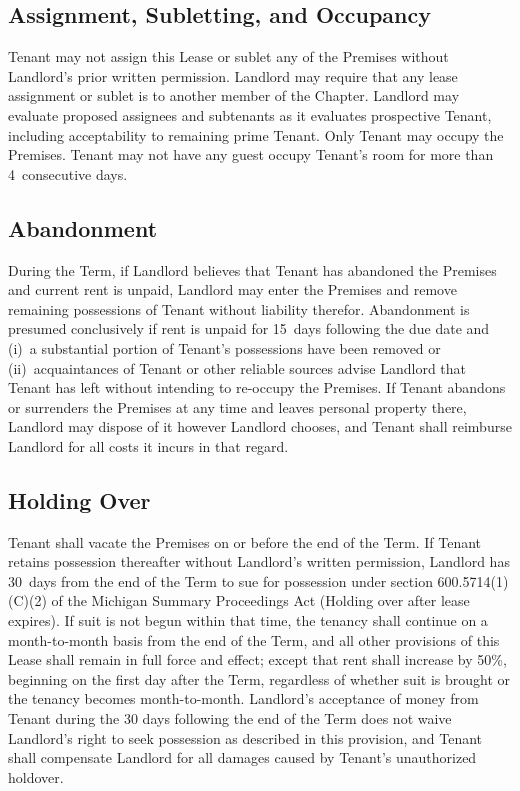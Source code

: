 \documentclass{article}
\begin{document}
\subsection{Assignment, Subletting, and Occupancy}
Tenant may not assign this Lease or sublet any of the Premises without
Landlord’s prior written permission. Landlord may require that any lease
assignment or sublet is to another member of the Chapter. Landlord may evaluate
proposed assignees and subtenants as it evaluates prospective Tenant, including
acceptability to remaining prime Tenant. Only Tenant may occupy the Premises.
Tenant may not have any guest occupy Tenant’s room for more than 4~consecutive
days.

\subsection{Abandonment}
During the Term, if Landlord believes that Tenant has abandoned the Premises and
current rent is unpaid, Landlord may enter the Premises and remove remaining
possessions of Tenant without liability therefor. Abandonment is presumed
conclusively if rent is unpaid for 15~days following the due date and (i)~a
substantial portion of Tenant’s possessions have been removed or
(ii)~acquaintances of Tenant or other reliable sources advise Landlord that
Tenant has left without intending to re-occupy the Premises. If Tenant abandons
or surrenders the Premises at any time and leaves personal property there,
Landlord may dispose of it however Landlord chooses, and Tenant shall reimburse
Landlord for all costs it incurs in that regard.

\subsection{Holding Over}
Tenant shall vacate the Premises on or before the end of the Term. If Tenant
retains possession thereafter without Landlord’s written permission, Landlord
has 30~days from the end of the Term to sue for possession under section
600.5714(1)(C)(2) of the Michigan Summary Proceedings Act (Holding over after
lease expires). If suit is not begun within that time, the tenancy shall
continue on a month-to-month basis from the end of the Term, and all other
provisions of this Lease shall remain in full force and effect; except that rent
shall increase by 50\%, beginning on the first day after the Term, regardless of
whether suit is brought or the tenancy becomes month-to-month. Landlord’s
acceptance of money from Tenant during the 30 days following the end of the Term
does not waive Landlord’s right to seek possession as described in this
provision, and Tenant shall compensate Landlord for all damages caused by
Tenant’s unauthorized holdover.
\end{document}
